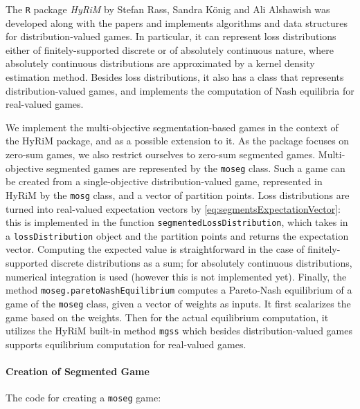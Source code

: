 \documentclass[a4paper]{scrreprt}
\theoremstyle{definition}
\begin{document}
    The \texttt{R} package \emph{HyRiM}  by Stefan Rass, Sandra König and Ali Alshawish was developed along with the papers \cite{bib:rassGameRiskManagI,bib:rassGameRiskManagII,bib:rassGameRiskManagIII} and implements algorithms and data structures for distribution-valued games.
    In particular, it can represent loss distributions either of finitely-supported discrete or of absolutely continuous nature, where absolutely continuous distributions are approximated by a kernel density estimation method. Besides loss distributions, it also has a class that represents distribution-valued games, and implements the computation of Nash equilibria for real-valued games.
    
    We implement the multi-objective segmentation-based games in the context of the HyRiM package, and as a possible extension to it. As the package focuses on zero-sum games, we also restrict ourselves to zero-sum segmented games.
    Multi-objective segmented games are represented by the \texttt{moseg} class. Such a game can be created from a single-objective distribution-valued game, represented in HyRiM by the \texttt{mosg} class, and a vector of partition points.
    Loss distributions are turned into real-valued expectation vectors by \eqref{eq:segmentsExpectationVector}: this is implemented in the function \texttt{segmentedLossDistribution}, which takes in a \texttt{lossDistribution} object and the partition points and returns the expectation vector.
    Computing the expected value is straightforward in the case of finitely-supported discrete distributions as a sum; for absolutely continuous distributions, numerical integration is used 
    (however this is not implemented yet).
    Finally, the method \texttt{moseg.paretoNashEquilibrium} computes a Pareto-Nash equilibrium of a game of the \texttt{moseg} class, given a vector of weights as inputs.
    It first scalarizes the game based on the weights.
    Then for the actual equilibrium computation, it utilizes the HyRiM built-in method \texttt{mgss} which besides distribution-valued games supports equilibrium computation for real-valued games.
    
    \paragraph{Creation of Segmented Game}
    The code for creating a \texttt{moseg} game:
    
    
    
\end{document}
